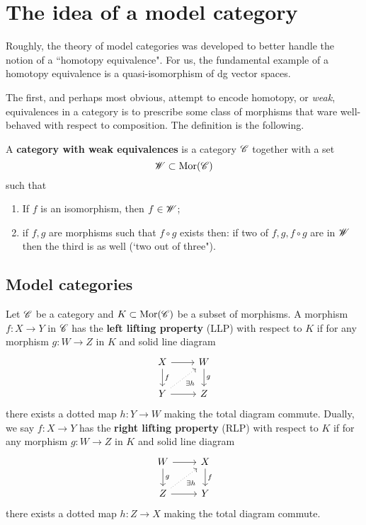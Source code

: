\documentclass[11pt]{amsart}
\begin{document}
\section{The idea of a model category}
Roughly, the theory of model categories was developed to better handle the notion of a ``homotopy equivalence". 
For us, the fundamental example of a homotopy equivalence is a quasi-isomorphism of dg vector spaces. 

The first, and perhaps most obvious, attempt to encode homotopy, or {\em weak}, equivalences in a category is to prescribe some class of morphisms that ware well-behaved with respect to composition. 
The definition is the following. 

\begin{dfn}
A {\bf category with weak equivalences} is a category $\mathscr C$ together with a set
\[
\mathscr W \subset {\rm Mor}(\mathscr C)
\]
such that
\begin{enumerate}
\item If $f$ is an isomorphism, then $f \in \mathscr W$;
\item if $f,g$ are morphisms such that $f \circ g$ exists then: if two of $f, g, f \circ g$ are in $\mathscr W$ then the third is as well (`two out of three").
\end{enumerate}
\end{dfn}

\subsection{Model categories}

\begin{dfn}
Let $\mathscr C$ be a category and $K \subset {\rm Mor}(\mathscr C)$ be a subset of morphisms. 
A morphism $f : X \to Y$ in $\mathscr C$ has the {\bf left lifting property} (LLP) with respect to $K$ if for any morphism $g : W \to Z$ in $K$ and solid line diagram
\[
\begin{tikzcd}
X \ar[r] \ar[d,"f"] & W \ar[d,"g"] \\ 
Y \ar[r] \ar[ur, dotted, "\exists h"'] & Z 
\end{tikzcd}
\]
there exists a dotted map $h : Y \to W$ making the total diagram commute. 
Dually, we say $f : X \to Y$ has the {\bf right lifting property} (RLP) with respect to $K$ if
for any morphism $g : W \to Z$ in $K$ and solid line diagram
\[
\begin{tikzcd}
W \ar[r] \ar[d,"g"] & X \ar[d,"f"] \\ 
Z \ar[r] \ar[ur, dotted, "\exists h"'] & Y
\end{tikzcd}
\]
there exists a dotted map $h : Z \to X$ making the total diagram commute. 
\end{dfn}
\end{document}
